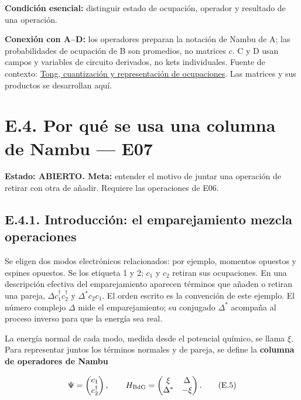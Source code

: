 \documentclass[
  spanish,
  10pt,
  a4paper,
]{article}
\begin{document}
\textbf{Condición esencial:} distinguir estado de ocupación, operador y
resultado de una operación.

\textbf{Conexión con A--D:} los operadores preparan la notación de Nambu
de A; las probabilidades de ocupación de B son promedios, no matrices
\(c\). C y D usan campos y variables de circuito derivados, no kets
individuales. Fuente de contexto:
\href{https://www.damtp.cam.ac.uk/user/tong/qft.htm}{Tong, cuantización
y representación de ocupaciones}. Las matrices y sus productos se
desarrollan aquí.


\section{E.4. Por qué se usa una columna de Nambu ---
E07}\label{e.4.-por-quuxe9-se-usa-una-columna-de-nambu-e07}

\textbf{Estado: ABIERTO. Meta:} entender el motivo de juntar una
operación de retirar con otra de añadir. Requiere las operaciones de
E06.

\subsection{E.4.1. Introducción: el emparejamiento mezcla
operaciones}\label{e.4.1.-introducciuxf3n-el-emparejamiento-mezcla-operaciones}

Se eligen dos modos electrónicos relacionados: por ejemplo, momentos
opuestos y espines opuestos. Se los etiqueta 1 y 2; \(c_1\) y \(c_2\)
retiran sus ocupaciones. En una descripción efectiva del emparejamiento
aparecen términos que añaden o retiran una pareja,
\(\Delta c_1^\dagger c_2^\dagger\) y \(\Delta^*c_2c_1\). El orden
escrito es la convención de este ejemplo. El número complejo \(\Delta\)
mide el emparejamiento; su conjugado \(\Delta^*\) acompaña al proceso
inverso para que la energía sea real.

La energía normal de cada modo, medida desde el potencial químico, se
llama \(\xi\). Para representar juntos los términos normales y de
pareja, se define la \textbf{columna de operadores de Nambu}

\[
\Psi=\begin{pmatrix}c_1\\c_2^\dagger\end{pmatrix},\qquad
H_{\rm BdG}=\begin{pmatrix}\xi&\Delta\\\Delta^*&-\xi\end{pmatrix}.
\tag{E.5}
\]
\end{document}
